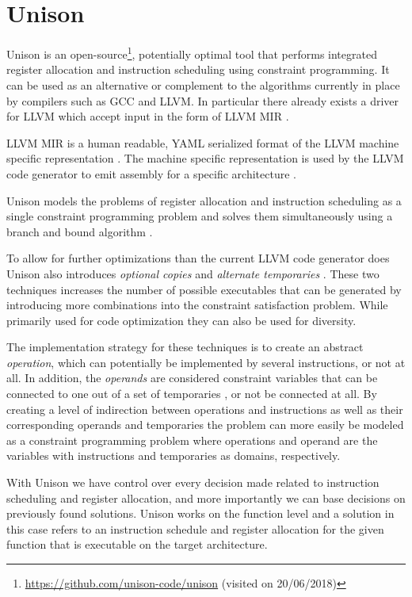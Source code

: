 \section{Unison}
\label{sec:unison}

Unison is an open-source\footnote{\url{https://github.com/unison-code/unison} (visited on 20/06/2018)},
potentially optimal tool that performs integrated register allocation and instruction
scheduling using constraint programming. It can be used as an alternative or complement to
the algorithms currently in place by compilers such as GCC and LLVM. In particular there
already exists a driver for LLVM which accept input in the form of LLVM MIR \cite{unison-docs}.

LLVM MIR is a human readable, YAML serialized format of the LLVM machine specific
representation \cite{llvm-mir-lang-ref}. The machine specific representation is used by the
LLVM code generator to emit assembly for a specific architecture \cite{welcome-to-backend}.

Unison models the problems of register allocation and instruction scheduling as a single
constraint programming problem and solves them simultaneously using a branch and bound
algorithm \cite{unison-docs,reg-alloc-inst-sched-uni,unison-src}.

To allow for further optimizations than the current LLVM code generator does Unison also
introduces \textit{optional copies} and \textit{alternate temporaries}
\cite{reg-alloc-inst-sched-uni}. These two techniques increases the number of possible
executables that can be generated by introducing more combinations into the constraint
satisfaction problem. While primarily used for code optimization they can also be used for
diversity.

The implementation strategy for these techniques is to create an abstract \textit{operation},
which can potentially be implemented by several instructions, or not at all. In addition,
the \textit{operands} are considered constraint variables that can be connected to one out
of a set of temporaries \cite{unison-docs}, or not be connected at all. By creating a
level of indirection between operations and instructions as well as their corresponding
operands and temporaries the problem can more easily be modeled as a constraint
programming problem where operations and operand are the variables with instructions and
temporaries as domains, respectively.

With Unison we have control over every decision made related to instruction scheduling and
register allocation, and more importantly we can base decisions on previously found solutions.
Unison works on the function level and a solution in this case refers to an instruction
schedule and register allocation for the given function that is executable on the target
architecture.
